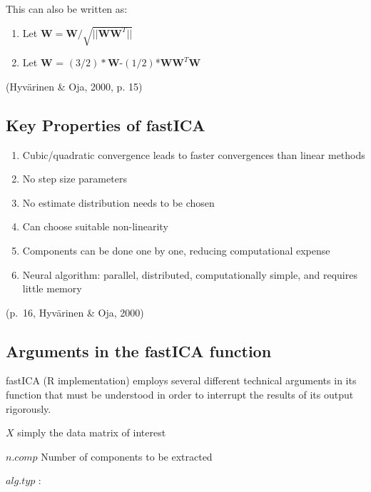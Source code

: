 \documentclass[12pt,twoside]{amherstthesis}
\begin{document}
  This can also be written as:
  
  \begin{enumerate}
  \def\labelenumi{\arabic{enumi}.}
  \item
    Let \(\textbf{W} = \textbf{W}/\sqrt{||\textbf{WW}^T||}\)
  \item
    Let \(\textbf{W}\) =
    \((3/2)*\)\(\textbf{W}\)-\((1/2)\)*\(\textbf{W}\textbf{W}^T\textbf{W}\)
  \end{enumerate}
  
  (Hyvärinen \& Oja, 2000, p. 15)
  
  \subsection{Key Properties of fastICA}\label{key-properties-of-fastica}
  
  \begin{enumerate}
  \def\labelenumi{\arabic{enumi}.}
  \item
    Cubic/quadratic convergence leads to faster convergences than linear
    methods
  \item
    No step size parameters
  \item
    No estimate distribution needs to be chosen
  \item
    Can choose suitable non-linearity
  \item
    Components can be done one by one, reducing computational expense
  \item
    Neural algorithm: parallel, distributed, computationally simple, and
    requires little memory
  \end{enumerate}
  
  (p.~16, Hyvärinen \& Oja, 2000)
  
  \subsection{Arguments in the fastICA
  function}\label{arguments-in-the-fastica-function}
  
  fastICA (R implementation) employs several different technical arguments
  in its function that must be understood in order to interrupt the
  results of its output rigorously.
  
  \(X\) simply the data matrix of interest
  
  \(n.comp\) Number of components to be extracted
  
  \(alg.typ\) : \newline
  
\end{document}
